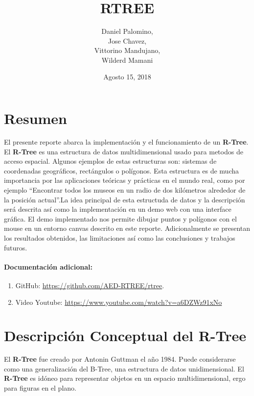 \documentclass[12pt]{article}
\title{RTREE} %
\author{Daniel Palomino, \\ Jose Chavez, \\Vittorino Mandujano, \\Wilderd Mamani}
\date{Agosto 15, 2018}
\begin{document}
\maketitle
\section*{Resumen}  %

El presente reporte abarca la implementación y el funcionamiento de un \textbf{R-Tree}. El \textbf{R-Tree} es una estructura de datos multidimensional usado para metodos de acceso espacial. Algunos ejemplos de estas estructuras son: sistemas de coordenadas geográficos, rectángulos o polígonos. Esta  estructura es de mucha importancia por las aplicaciones teóricas y prácticas en el mundo real, como por ejemplo ``Encontrar todos los museos en un radio de dos kilómetros alrededor de la posición actual''.La idea principal de esta estructuda de datos y la descripción será descrita así como la implementación en un demo web con una interface gráfica. El demo implementado nos permite dibujar puntos y polígonos con el mouse en un entorno canvas descrito en este reporte. Adicionalmente se presentan los resultados obtenidos, las limitaciones así como las conclusiones y trabajos futuros.


\paragraph{Documentación adicional:} 
\begin{enumerate}
\item GitHub: \url{https://github.com/AED-RTREE/rtree}. 
\item Video Youtube: \url{https://www.youtube.com/watch?v=a6DZWz91xNo}
\end{enumerate}
\section*{Descripción Conceptual del R-Tree} %
El \textbf{R-Tree} fue creado por Antonin Guttman el año 1984. Puede considerarse como una generalización del B-Tree, una estructura de datos unidimensional. El \textbf{R-Tree} es idóneo para representar objetos en un espacio multidimensional, ergo para figuras en el plano.\\
\end{document}
